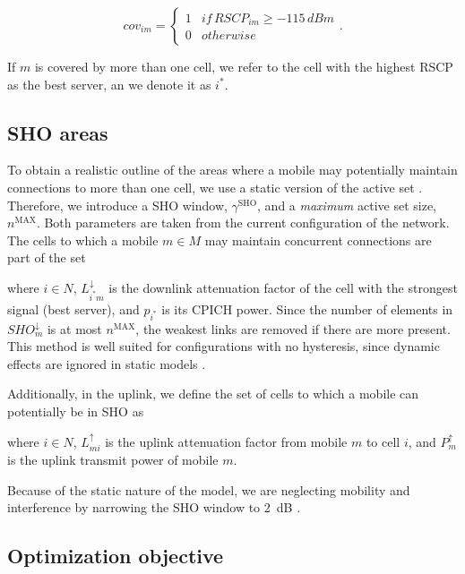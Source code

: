 \begin{equation}
cov{}_{im}=\begin{cases}
1 & if\, RSCP_{im}\ge-115\, dBm\\
0 & otherwise
\end{cases}.
\end{equation}


If $m$ is covered by more than one cell, we refer to the cell with
the highest RSCP as the best server, an we denote it as $i^{*}$.


\subsection{SHO areas \label{sub:SHO-areas}}

To obtain a realistic outline of the areas where a mobile may potentially
maintain connections to more than one cell, we use a static version
of the active set \cite{nawrocki2006understanding}. Therefore, we
introduce a SHO window, $\gamma^{\mathrm{SHO}}$, and a \textit{\emph{maximum}}
active set size, $n^{\mathrm{MAX}}$. Both parameters are taken from
the current configuration of the network. The cells to which a mobile
$m\in M$ may maintain concurrent connections are part of the set 



\noindent where $i\in N$, $L_{i^{*}m}^{\downarrow}$ is the downlink
attenuation factor of the cell with the strongest signal (best server),
and $p_{i^{*}}$ is its CPICH power. Since the number of elements
in $SHO_{m}^{\downarrow}$ is at most $n^{\mathrm{MAX}}$, the weakest
links are removed if there are more present. This method is well suited
for configurations with no hysteresis, since dynamic effects are ignored
in static models \cite{nawrocki2006understanding}. 

Additionally, in the uplink, we define the set of cells to which a
mobile can potentially be in SHO as



\noindent where $i\in N$, $L_{mi}^{\uparrow}$ is the uplink attenuation
factor from mobile $m$ to cell $i$, and $P_{m}^{\uparrow}$ is the
uplink transmit power of mobile $m$.

Because of the static nature of the model, we are neglecting mobility
and interference by narrowing the SHO window to 2~dB \cite{nawrocki2006understanding}.


\subsection{Optimization objective}

